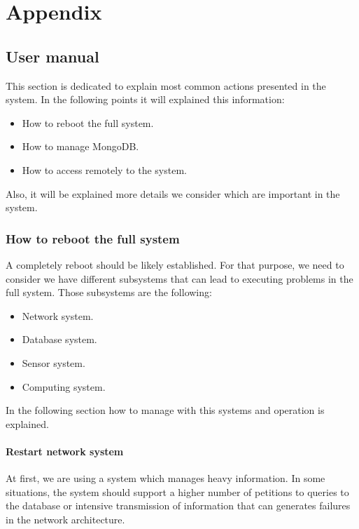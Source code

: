 \renewcommand{\chaptername}{}
\renewcommand{\thechapter}{}
\chapter{Appendix}
\renewcommand{\thechapter}{\Alph{chapter}}
\newpage

\section{User manual}
This section is dedicated to explain most common actions presented in the system. In the following points it will explained this information:

\begin{itemize}
\item How to reboot the full system.
\item How to manage MongoDB.
\item How to access remotely to the system.
\end{itemize}

Also, it will be explained more details we consider which are important in the system.\\

\subsection{How to reboot the full system}

A completely reboot should be likely established. For that purpose, we need to consider we have different subsystems that can lead to executing problems in the full system. Those subsystems are the following:

\begin{itemize}
\item Network system.
\item Database system.
\item Sensor system.
\item Computing system.
\end{itemize}

In the following section how to manage with this systems and operation is explained.\\

\subsubsection{Restart network system}

At first, we are using a system which manages heavy information. In some situations, the system should support a higher number of petitions to queries to the database or intensive transmission of information that can generates failures in the network architecture.\\


